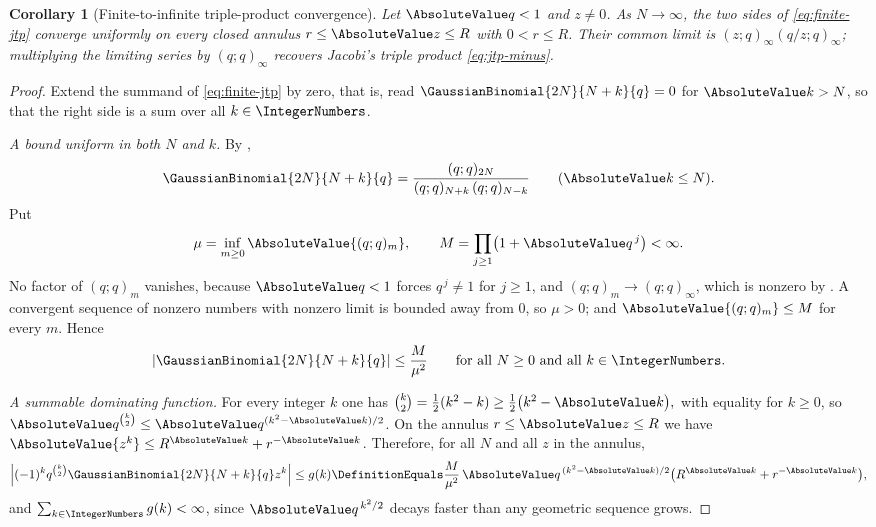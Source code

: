 \documentclass[11pt,a4paper,oneside,openany]{book}
\newtheorem{corollary}[corollary]{Corollary}
\theoremstyle{definition}
\theoremstyle{remark}
\begin{document}
\begin{corollary}[Finite-to-infinite triple-product convergence]\label{cor:jtp-from-finite}
Let $\AbsoluteValue q<1$ and $z\ne0$.  As $N\to\infty$, the two sides of
\eqref{eq:finite-jtp} converge uniformly on every closed annulus
$r\le\AbsoluteValue z\le R$ with $0<r\le R$.  Their common limit is
$(z;q)_\infty(q/z;q)_\infty$; multiplying the limiting series by
$(q;q)_\infty$ recovers Jacobi's triple product \eqref{eq:jtp-minus}.
\end{corollary}

\begin{proof}
Extend the summand of \eqref{eq:finite-jtp} by zero, that is, read $\GaussianBinomial{2N}{N+k}{q}=0$ for $\AbsoluteValue k>N$, so that the right side is a sum over all $k\in\IntegerNumbers$.

\emph{A bound uniform in both $N$ and $k$.}  By ,
\[
 \GaussianBinomial{2N}{N+k}{q}
 =\frac{(q;q)_{2N}}{(q;q)_{N+k}\,(q;q)_{N-k}}
 \qquad(\AbsoluteValue k\le N).
\]
Put
\[
 \mu=\inf_{m\ge0}\AbsoluteValue{(q;q)_m},
 \qquad
 M=\prod_{j\ge1}\bigl(1+\AbsoluteValue q^{\,j}\bigr)<\infty .
\]
No factor of $(q;q)_m$ vanishes, because $\AbsoluteValue q<1$ forces $q^{\,j}\ne1$ for $j\ge1$, and $(q;q)_m\to(q;q)_\infty$, which is nonzero by .  A convergent sequence of nonzero numbers with nonzero limit is bounded away from $0$, so $\mu>0$; and $\AbsoluteValue{(q;q)_m}\le M$ for every $m$.  Hence
\begin{equation}
 \left|\GaussianBinomial{2N}{N+k}{q}\right|\le\frac{M}{\mu^{2}}
 \qquad\text{for all }N\ge0\text{ and all }k\in\IntegerNumbers .
 \label{eq:central-qbinom-uniform-bound}
\end{equation}

\emph{A summable dominating function.}  For every integer $k$ one has
\(
 \binom k2=\tfrac12(k^2-k)\ge\tfrac12\bigl(k^2-\AbsoluteValue k\bigr),
\)
with equality for $k\ge0$, so $\AbsoluteValue q^{\binom k2}\le\AbsoluteValue q^{(k^2-\AbsoluteValue k)/2}$.  On the annulus $r\le\AbsoluteValue z\le R$ we have $\AbsoluteValue{z^{k}}\le R^{\AbsoluteValue k}+r^{-\AbsoluteValue k}$.  Therefore, for all $N$ and all $z$ in the annulus,
\[
 \left|(-1)^kq^{\binom k2}\GaussianBinomial{2N}{N+k}{q}z^{k}\right|
 \le g(k)\DefinitionEquals
 \frac{M}{\mu^{2}}\,\AbsoluteValue q^{\,(k^2-\AbsoluteValue k)/2}
 \bigl(R^{\AbsoluteValue k}+r^{-\AbsoluteValue k}\bigr),
\]
and $\sum_{k\in\IntegerNumbers}g(k)<\infty$, since $\AbsoluteValue q^{\,k^2/2}$ decays faster than any geometric sequence grows.


\end{proof}
\end{document}
